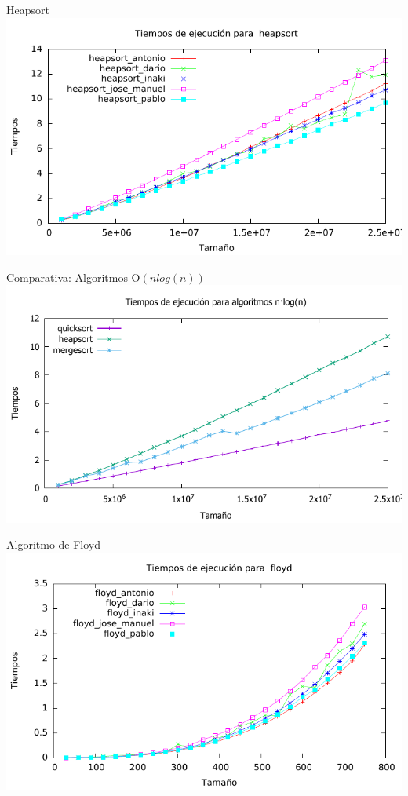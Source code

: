 \documentclass[10pt,compress,usetitleprogressbar,mathserif]{beamer}
\begin{document}
\begin{frame}{Heapsort}
	\includegraphics[width = \textwidth ]{heapsort_todos_g}
\end{frame}

\begin{frame}{Comparativa: Algoritmos O$(nlog(n))$}
		\includegraphics[width = \textwidth ]{comparativa_logaritmicos_g}
\end{frame}

\begin{frame}{Algoritmo de Floyd}
		\includegraphics[width = \textwidth ]{floyd_todos_g}
\end{frame}
\end{document}
